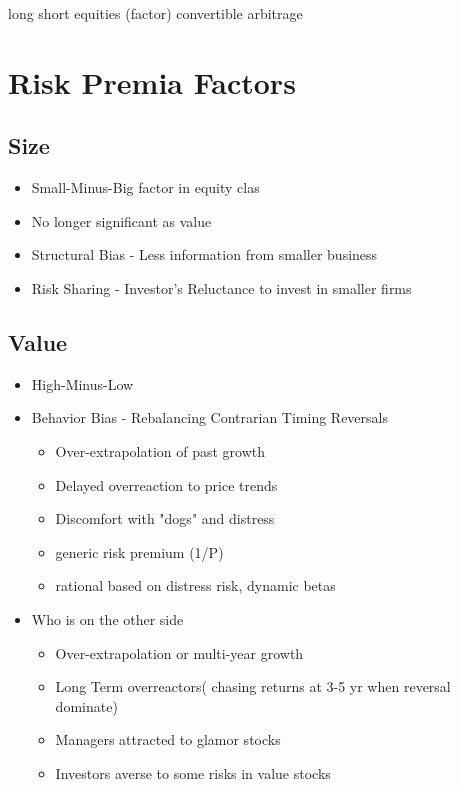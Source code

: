 \documentclass[11pt, openany]{book}              %
\begin{document}
long short equities (factor) 
convertible arbitrage

\section{Risk Premia Factors}

\subsection{Size}
\begin{itemize}
	\item Small-Minus-Big factor in equity clas
	\item No longer significant as value
	\item Structural Bias - Less information from smaller business
	\item Risk Sharing - Investor's Reluctance to invest in smaller firms
\end{itemize}


\subsection{Value}
\begin{itemize}
	\item High-Minus-Low 
	\item Behavior Bias - Rebalancing Contrarian Timing Reversals
	\begin{itemize}
			\item Over-extrapolation of past growth
			\item Delayed overreaction to price trends
			\item Discomfort with "dogs" and distress
			\item generic risk premium (1/P)
			\item rational based on distress risk, dynamic betas
		\end{itemize}
	\item Who is on the other side
	\begin{itemize}
			\item Over-extrapolation or multi-year growth
			\item Long Term overreactors( chasing returns at 3-5 yr when reversal dominate)
			\item Managers attracted to glamor stocks
			\item Investors averse to some risks in value stocks
		\end{itemize}
\end{itemize}
\end{document}
